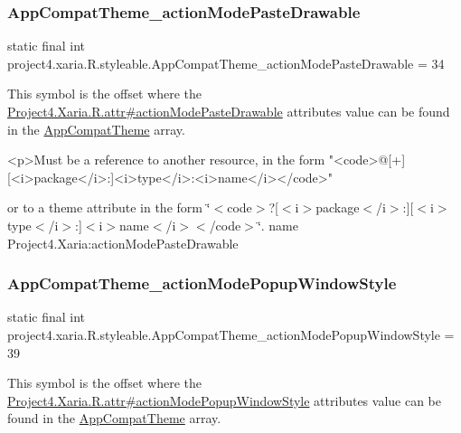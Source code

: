 \subsubsection{\texorpdfstring{App\+Compat\+Theme\+\_\+action\+Mode\+Paste\+Drawable}{AppCompatTheme\_actionModePasteDrawable}}
{\footnotesize\ttfamily static final int project4.\+xaria.\+R.\+styleable.\+App\+Compat\+Theme\+\_\+action\+Mode\+Paste\+Drawable = 34\hspace{0.3cm}{\ttfamily [static]}}

This symbol is the offset where the \hyperlink{}{Project4.\+Xaria.\+R.\+attr\#action\+Mode\+Paste\+Drawable} attribute\textquotesingle{}s value can be found in the \hyperlink{classproject4_1_1xaria_1_1R_1_1styleable_aad8bec413e2350f9404e6ff0e831a85d}{App\+Compat\+Theme} array.

\begin{DoxyVerb}      <p>Must be a reference to another resource, in the form "<code>@[+][<i>package</i>:]<i>type</i>:<i>name</i></code>"
\end{DoxyVerb}
 or to a theme attribute in the form \char`\"{}$<$code$>$?\mbox{[}$<$i$>$package$<$/i$>$\+:\mbox{]}\mbox{[}$<$i$>$type$<$/i$>$\+:\mbox{]}$<$i$>$name$<$/i$>$$<$/code$>$\char`\"{}.  name Project4.\+Xaria\+:action\+Mode\+Paste\+Drawable \mbox{\label{classproject4_1_1xaria_1_1R_1_1styleable_a417ee14da32163c43ef73a9115b2a4e8}} 
\subsubsection{\texorpdfstring{App\+Compat\+Theme\+\_\+action\+Mode\+Popup\+Window\+Style}{AppCompatTheme\_actionModePopupWindowStyle}}
{\footnotesize\ttfamily static final int project4.\+xaria.\+R.\+styleable.\+App\+Compat\+Theme\+\_\+action\+Mode\+Popup\+Window\+Style = 39\hspace{0.3cm}{\ttfamily [static]}}

This symbol is the offset where the \hyperlink{}{Project4.\+Xaria.\+R.\+attr\#action\+Mode\+Popup\+Window\+Style} attribute\textquotesingle{}s value can be found in the \hyperlink{classproject4_1_1xaria_1_1R_1_1styleable_aad8bec413e2350f9404e6ff0e831a85d}{App\+Compat\+Theme} array.

